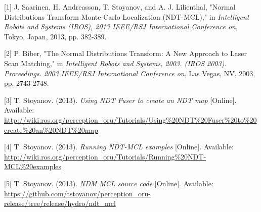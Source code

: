 \documentclass[12pt]{article}
\begin{document}
	\setlength{\parindent}{0.0in}

	[1] J. Saarinen, H. Andreasson, T. Stoyanov, and A. J. Lilienthal, "Normal Distributions Transform Monte-Carlo Localization (NDT-MCL)," in {\it Intelligent Robots and Systems (IROS), 2013 IEEE/RSJ International Conference on}, Tokyo, Japan, 2013, pp. 382-389.
	\newline

	[2] P. Biber, "The Normal Distributions Transform: A New Approach to Laser Scan Matching," in {\it Intelligent Robots and Systems, 2003. (IROS 2003). Proceedings. 2003 IEEE/RSJ International Conference on}, Las Vegas, NV, 2003, pp. 2743-2748.
	\newline

	[3] T. Stoyanov. (2013). {\it Using NDT Fuser to create an NDT map} [Online]. Available: \url{http://wiki.ros.org/perception_oru/Tutorials/Using%20NDT%20Fuser%20to%20create%20an%20NDT%20map}
	\newline

	[4] T. Stoyanov. (2013). {\it Running NDT-MCL examples} [Online]. Available: \url{http://wiki.ros.org/perception_oru/Tutorials/Running%20NDT-MCL%20examples}
	\newline

	[5] T. Stoyanov. (2013). {\it NDM MCL source code} [Online]. Available: \url{https://github.com/tstoyanov/perception_oru-release/tree/release/hydro/ndt_mcl}
\end{document}
